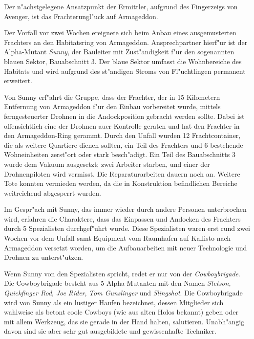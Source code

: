 
Der n"achstgelegene Ansatzpunkt der Ermittler, aufgrund des Fingerzeigs von Avenger, ist das Frachterungl"uck auf Armageddon.

Der Vorfall vor zwei Wochen ereignete sich beim Anbau eines ausgemusterten Frachters an den Habitatsring von Armageddon. Ansprechpartner hierf"ur ist der Alpha-Mutant \emph{Sunny}, der Bauleiter mit Zust"andigkeit f"ur den sogenannten blauen Sektor, Bauabschnitt 3. Der blaue Sektor umfasst die Wohnbereiche des Habitats und wird aufgrund des st"andigen Stroms von Fl"uchtlingen permanent erweitert.

Von Sunny erf"ahrt die Gruppe, dass der Frachter, der in 15 Kilometern Entfernung von Armageddon f"ur den Einbau vorbereitet wurde, mittels ferngesteuerter Drohnen in die Andockposition gebracht werden sollte. Dabei ist offensichtlich eine der Drohnen au\3er Kontrolle geraten und hat den Frachter in den Armageddon-Ring gerammt. Durch den Unfall wurden 12 Frachtcontainer, die als weitere Quartiere dienen sollten, ein Teil des Frachters und 6 bestehende Wohneinheiten zerst"ort oder stark besch"adigt. Ein Teil des Bauabschnitts 3 wurde dem Vakuum ausgesetzt; zwei Arbeiter starben, und einer der Drohnenpiloten wird vermisst. Die Reparaturarbeiten dauern noch an. Weitere Tote konnten vermieden werden, da die in Konstruktion befindlichen Bereiche weitreichend abgesperrt wurden.

Im Gespr"ach mit Sunny, das immer wieder durch andere Personen unterbrochen wird, erfahren die Charaktere, dass das Einpassen und Andocken des Frachters durch 5 Spezialisten durchgef"uhrt wurde. Diese Spezialisten waren erst rund zwei Wochen vor dem Unfall samt Equipment vom Raumhafen auf Kallisto nach Armageddon versetzt worden, um die Aufbauarbeiten mit neuer Technologie und Drohnen zu unterst"utzen.

Wenn Sunny von den Spezialisten spricht, redet er nur von der \emph{Cowboybrigade}. Die Cowboybrigade besteht aus 5 Alpha-Mutanten mit den Namen \emph{Stetson}, \emph{Quickfinger Rod}, \emph{Joe Rider}, \emph{Tom Gunslinger} und \emph{Slingshot}. Die Cowboybrigade wird von Sunny als ein lustiger Haufen bezeichnet, dessen Mitglieder sich wahlweise als betont coole Cowboys (wie aus alten Holos bekannt) geben oder mit allem Werkzeug, das sie gerade in der Hand halten, salutieren. Unabh"angig davon sind sie aber sehr gut ausgebildete und gewissenhafte Techniker.

